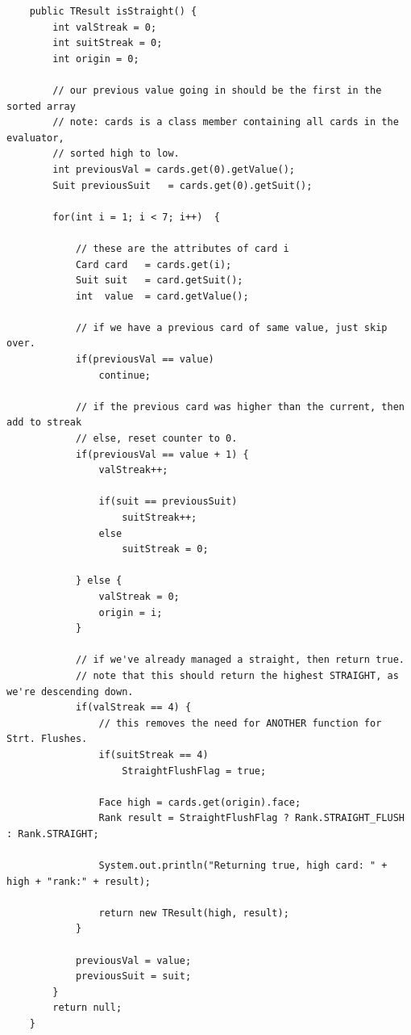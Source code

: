 \documentclass[11pt]{article}
\begin{document}
\begin{lstlisting}
    public TResult isStraight() {
        int valStreak = 0;
        int suitStreak = 0;
        int origin = 0;

        // our previous value going in should be the first in the sorted array
        // note: cards is a class member containing all cards in the evaluator, 
        // sorted high to low.
        int previousVal = cards.get(0).getValue();
        Suit previousSuit   = cards.get(0).getSuit();

        for(int i = 1; i < 7; i++)  {

            // these are the attributes of card i
            Card card   = cards.get(i);
            Suit suit   = card.getSuit();
            int  value  = card.getValue();

            // if we have a previous card of same value, just skip over.
            if(previousVal == value)
                continue;

            // if the previous card was higher than the current, then add to streak
            // else, reset counter to 0.
            if(previousVal == value + 1) {
                valStreak++;

                if(suit == previousSuit)
                    suitStreak++;
                else
                    suitStreak = 0;

            } else {
                valStreak = 0;
                origin = i;
            }

            // if we've already managed a straight, then return true.
            // note that this should return the highest STRAIGHT, as we're descending down.
            if(valStreak == 4) {
                // this removes the need for ANOTHER function for Strt. Flushes.
                if(suitStreak == 4)
                    StraightFlushFlag = true;

                Face high = cards.get(origin).face;
                Rank result = StraightFlushFlag ? Rank.STRAIGHT_FLUSH : Rank.STRAIGHT;

                System.out.println("Returning true, high card: " + high + "rank:" + result);

                return new TResult(high, result);
            }

            previousVal = value;
            previousSuit = suit;
        }
        return null;
    }
\end{lstlisting}
\end{document}
